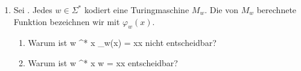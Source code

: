 \documentclass{bschlangaul-aufgabe}
\begin{document}
\begin{enumerate}

\item Sei . Jedes $w \in \Sigma^*$ kodiert eine
Turingmaschine $M_w$. Die von  $M_w$ berechnete Funktion bezeichnen wir
mit $\varphi_w(x)$.

\begin{enumerate}


\item Warum ist
\bAusdruck
{w \in \Sigma^*}
{\exists x \colon \varphi_w(x) = xx} nicht entscheidbar?


\item Warum ist \bAusdruck
{w \in \Sigma^*}
{\exists x \colon w = xx} entscheidbar?

\end{enumerate}
\end{enumerate}
\end{document}
